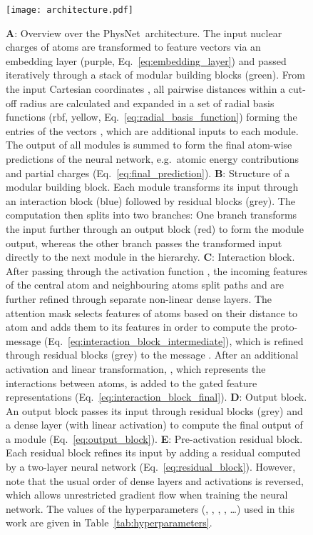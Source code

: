 \documentclass[12pt]{article}
\newcommand{\nn}{PhysNet}
\begin{document}
\begin{figure}[htbp]
\captionsetup{width=1.0\textwidth}
\centering
\texttt{[image: architecture.pdf]}
\hspace{1cm}
\caption{\textbf{A}: Overview over the \nn\ architecture. The input
  nuclear charges  of  atoms are transformed to feature
  vectors  via an embedding layer
  (purple, Eq.~\ref{eq:embedding_layer}) and passed iteratively
  through a stack of  modular building blocks
  (green). From the input Cartesian coordinates , all
  pairwise distances within a cut-off radius  are
  calculated and expanded in a set of  radial basis functions (rbf,
  yellow, Eq.~\ref{eq:radial_basis_function}) forming the entries of
  the vectors , which are
  additional inputs to each module. The output of all modules is
  summed to form the final atom-wise predictions of the neural
  network, e.g.\ atomic energy contributions  and partial charges
   (Eq.~\ref{eq:final_prediction}). \textbf{B}: Structure of a
  modular building block. Each module transforms its input through an
  interaction block (blue) followed by 
  residual blocks (grey). The computation then splits into two
  branches: One branch transforms the input further through an output
  block (red) to form the module output, whereas the other branch
  passes the transformed input directly to the next module in the
  hierarchy. \textbf{C}: Interaction block. After passing through the
  activation function , the incoming features of the
  central atom  and neighbouring atoms  split paths and are
  further refined through separate non-linear dense layers. The
  attention mask  selects features of
  atoms  based on their distance to atom  and adds them to its
  features in order to compute the proto-message 
  (Eq.~\ref{eq:interaction_block_intermediate}), which is refined
  through  residual blocks (grey)
  to the message . After an additional activation and
  linear transformation, , which represents the
  interactions between atoms, is added to the gated feature
  representations 
  (Eq.~\ref{eq:interaction_block_final}). \textbf{D}: Output block. An
  output block passes its input through  residual blocks (grey) and a dense layer (with linear
  activation) to compute the final output of a module
  (Eq.~\ref{eq:output_block}). \textbf{E}: Pre-activation residual
  block. Each residual block refines its input by adding a residual
  computed by a two-layer neural network
  (Eq.~\ref{eq:residual_block}). However, note that the usual order of
  dense layers and activations is reversed, which allows unrestricted
  gradient flow when training the neural network.\cite{he2016identity} The values of the
  hyperparameters (, ,
  , , \dots) used in this work are given in
  Table~\ref{tab:hyperparameters}.}
	\label{fig:nn_architecture}
\end{figure}
\end{document}
